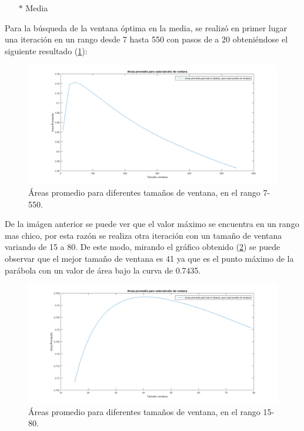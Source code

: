 \begin{itemize}
	\item[$*$]Media
\end{itemize}

Para la b\'usqueda de la ventana \'optima en la media, se realiz\'o en primer lugar una iteraci\'on en un rango desde 7 hasta 550 con pasos de a 20 obteni\'endose el siguiente resultado (\ref{fig:MediaRangoGrande}):

\begin{figure}[H]
	{
	\centering
	\includegraphics[width=1\textwidth]{Figures/MediaRangoGrande}
	\caption[Ventana Media 7-550]{\'Areas promedio para diferentes tama\~nos de ventana, en el rango 7-550.}
	\label{fig:MediaRangoGrande}
	}
\end{figure}

De la im\'agen anterior se puede ver que el valor m\'aximo se encuentra en un rango mas chico, por esta  raz\'on se realiza otra iteraci\'on con un tama\~no de ventana variando de 15 a 80. De este modo, mirando el gr\'afico obtenido  (\ref{fig:MediaRangoChico}) se puede observar que  el mejor tama\~no de ventana es 41 ya que es el punto m\'aximo de la par\'abola con un valor de \'area bajo la curva de 0.7435.

\begin{figure}[H]
	{
	\centering
	\includegraphics[width=1\textwidth]{Figures/MediaRangoChico}
	\caption[Ventana Media 15-80]{\'Areas promedio para diferentes tama\~nos de ventana, en el rango 15-80.}
	\label{fig:MediaRangoChico}
	}
\end{figure}

